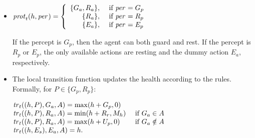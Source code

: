 \begin{example}
\begin{itemize}[$\bullet$]
    
  \item $\mathit{prot}_{t}(h,\mathit{per}_{}) = \left\{
      \begin{array}{rl}
        \{G_a, R_a\}, & \text{ if } \mathit{per}_{} = G_p\\ 
        \{R_a\}, & \text{ if } \mathit{per}_{} = R_p\\ 
        \{E_a\}, & \text{ if } \mathit{per}_{} = E_p\\
      \end{array} \right.$

    If the percept is $G_p$, then the agent can both guard and rest. If the
    percept is $R_p$ or $E_p$, the only available actions are resting and the
    dummy action $E_a$, respectively.
    
  \item The local transition function updates the health according to the
    rules. Formally, for $P \in \{G_p,R_p\}$:

    $\begin{array}{@{}l@{\quad}l}\small
       \tr{t}((h,P), G_a, A) = \max(h + G_p,0) &\\%
       \tr{t}((h,P), R_a, A) = \min(h + R_r, M_h) &\text{ if }G_a\in A\\
       \tr{t}((h,P), R_a, A) = \max(h + U_p,0) &\text{ if }G_a\notin A\\%
       
       \tr{t}((h,E_s), E_a, A) = h.\\
     \end{array}$

\end{itemize}

\end{example}

  
